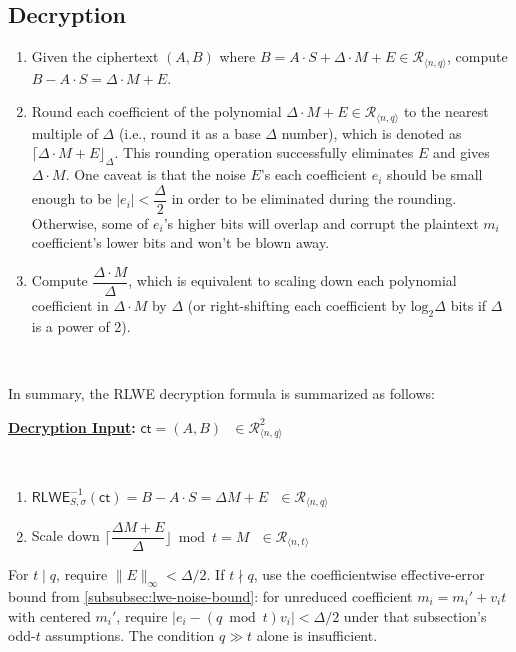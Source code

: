 \subsection{Decryption}
\label{subsec:rlwe-dec}

\begin{enumerate}
\item Given the ciphertext $(A, B)$ where $B = A \cdot S + \Delta \cdot M + E \in \mathcal{R}_{\langle n,q \rangle}$, compute $B - A \cdot S = \Delta \cdot M + E$. 
\item Round each coefficient of the polynomial $\Delta \cdot M + E \in \mathcal{R}_{\langle n,q \rangle}$ to the nearest multiple of $\Delta$ (i.e., round it as a base $\Delta$ number), which is denoted as $\lceil \Delta \cdot M + E \rfloor_{\Delta}$.  This rounding operation successfully eliminates $E$ and gives $\Delta \cdot M$. One caveat is that the noise $E$'s each coefficient $e_i$ should be small enough to be $|e_i| < \dfrac{\Delta}{2}$ in order to be eliminated during the rounding. Otherwise, some of $e_i$'s higher bits will overlap and corrupt the plaintext $m_i$ coefficient's lower bits and won't be blown away.
\item Compute $\dfrac{\Delta \cdot M}{\Delta}$, which is equivalent to scaling down each polynomial coefficient in $\Delta \cdot M$ by $\Delta$ (or right-shifting each coefficient by $\text{log}_2 \Delta$ bits if $\Delta$ is a power of 2).
\end{enumerate}

$ $

In summary, the RLWE decryption formula is summarized as follows:


\begin{tcolorbox}[title={\textbf{\tboxlabel{\ref*{subsec:rlwe-dec}} RLWE Decryption}}]

\textbf{\underline{Decryption Input}:} $\textsf{ct} = (A, B) \text{ } \in \mathcal{R}_{\langle n, q \rangle}^{2}$

$ $

\begin{enumerate}

\item $\textsf{RLWE}^{-1}_{S,\sigma}(\textsf{ct}) = B - A \cdot S = \Delta  M + E \text{ } \in \mathcal{R}_{\langle n,q \rangle}$ 
\item Scale down $\Bigg\lceil\dfrac{ \Delta M + E}{\Delta}\Bigg\rfloor \bmod t = M \text{ } \in \mathcal{R}_{\langle n,t \rangle}$

\end{enumerate}

For $t\mid q$, require $\|E\|_\infty<\Delta/2$. If $t\nmid q$, use the coefficientwise effective-error bound from \autoref{subsubsec:lwe-noise-bound}: for unreduced coefficient $m_i=m_i'+v_it$ with centered $m_i'$, require $|e_i-(q\bmod t)v_i|<\Delta/2$ under that subsection's odd-$t$ assumptions. The condition $q\gg t$ alone is insufficient.

\end{tcolorbox}